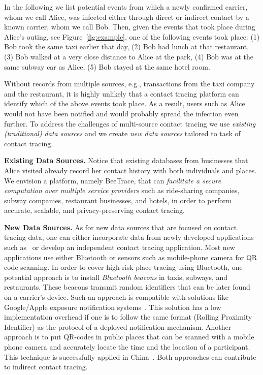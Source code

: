 \documentclass[11pt,dvipdfmx]{article}  %
\newcommand{\sysname}{\textsf{BeeTrace}\xspace}
\begin{document}
In the following we list potential events from which a newly confirmed carrier, whom we call Alice, was infected either through direct or indirect contact by a known carrier, whom we call Bob.
Then, given the events that took place during Alice's outing, see Figure~\ref{fig:example}, one of the following events took place: (1) Bob took the same taxi earlier that day, (2) Bob had lunch at that restaurant, (3) Bob walked at a very close distance to Alice at the park, (4) Bob was at the same subway car as Alice, (5) Bob stayed at the same hotel room.

Without records from multiple sources, e.g., transactions from the taxi company and the restaurant, it is highly unlikely that a contact tracing platform can identify which of the above events took place. As a result, users such as  Alice would not have been notified and would probably spread the infection even further. 
To address the challenges of multi-source contact tracing we use \emph{existing (traditional) data sources} and we create \emph{new data sources} tailored to task of contact tracing. 

\textbf{Existing Data Sources.} 
Notice that existing databases from businesses that Alice visited already record her contact history with both individuals and places. We envision a platform, namely \sysname, that can \emph{facilitate a secure computation over multiple service providers} such as ride-sharing companies, subway companies, restaurant businesses, and hotels, in order to perform accurate, scalable, and privacy-preserving contact tracing. 


\textbf{New Data Sources.} As for new data sources that are focused on contact tracing data, one  can either incorporate data from newly developed applications such as~\cite{apple-google-ppct} or develop an independent contact tracing application.  
Most new applications use either Bluetooth or sensors such as mobile-phone camera for QR code scanning. 
In order to cover high-risk place tracing using Bluetooth, one potential approach is to install \emph{Bluetooth beacons} in taxis, subways, and restaurants. These beacons transmit random identifiers that can be later found on a carrier's device. 
Such an approach is compatible with solutions like Google/Apple exposure notification systems~\cite{apple-google-ppct}. This solution has a low implementation overhead if one is to follow the same format (Rolling Proximity Identifier) as the protocol of a deployed notification mechanism. Another approach is to put QR-codes in public places that can be scanned with a mobile phone camera and accurately locate the time and the location of a participant.  
This technique is successfully applied in China~\cite{China-qrcode}. Both approaches can contribute to indirect contact tracing.
\end{document}
